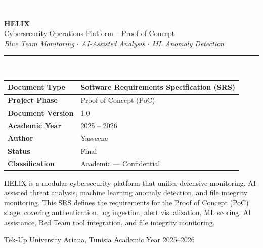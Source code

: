 \documentclass[12pt,a4paper]{report}
\begin{document}
	
	\begin{titlepage}
		\thispagestyle{empty}
		\noindent\colorbox{helixpurple}{%
			\parbox{\dimexpr\textwidth+2\fboxsep\relax}{%
				\vspace{10pt}
				\hspace{8pt}\textcolor{white}{\small\scshape{Software Requirements Specification --- PoC Version}}%
				\vspace{10pt}
			}%
		}
		\vspace{3cm}
		\begin{center}
			{\fontsize{52}{60}\selectfont\bfseries\color{helixpurple} HELIX}\\[10pt]
			{\Large\color{textsecondary}Cybersecurity Operations Platform -- Proof of Concept}\\[8pt]
			{\normalsize\color{helixpurplemid}\textit{Blue Team Monitoring $\cdot$ AI-Assisted Analysis $\cdot$ ML Anomaly Detection}}\\[30pt]
			\color{helixborder}\rule{0.65\textwidth}{0.5pt}\\[30pt]
		\end{center}
		\begin{center}
			\begin{tabular}{L{5.2cm} L{7.5cm}}
				\toprule
				\textbf{Document Type}    & Software Requirements Specification (SRS) \\
				\midrule
				\textbf{Project Phase}    & Proof of Concept (PoC) \\
				\textbf{Document Version} & 1.0 \\
				\textbf{Academic Year}    & 2025 -- 2026 \\
				\textbf{Author}           & Yasseene \\
				\textbf{Status}           & Final \\
				\textbf{Classification}   & Academic --- Confidential \\
				\bottomrule
			\end{tabular}
		\end{center}
		\vfill
		\begin{infobox}[title=Executive Summary]
HELIX is a modular cybersecurity platform that unifies defensive monitoring,
AI-assisted threat analysis, machine learning anomaly detection, and file integrity
monitoring. This SRS defines the requirements for the Proof of Concept (PoC) stage,
covering authentication, log ingestion, alert visualization, ML scoring, AI assistance,
Red Team tool integration, and file integrity monitoring.
		\end{infobox}
		\vspace{1cm}
		\noindent\colorbox{helixgraylight}{%
			\parbox{\dimexpr\textwidth+2\fboxsep\relax}{%
				\vspace{8pt}
				\hspace{8pt}\small\color{textsecondary}%
				Tek-Up University \hfill Ariana, Tunisia \hfill Academic Year 2025--2026
				\vspace{8pt}
			}%
		}
	\end{titlepage}
	
\end{document}
